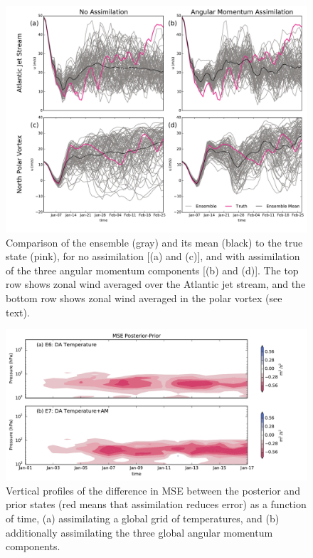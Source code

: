  \begin{figure}
	 \includegraphics[width=\textwidth]{Paper_figures/ERPDA_paper_point_checks.pdf}
	 \caption{Comparison of the ensemble (gray) and its mean (black) to the true state (pink), for no assimilation [(a) and (c)], and with assimilation of the three angular momentum components [(b) and (d)]. The top row shows zonal wind averaged over the Atlantic jet stream, and the bottom row shows zonal wind averaged in the polar vortex (see text).}
	 \label{fig:point_checks}
\end{figure}




 \begin{figure}
	 \includegraphics[width=\textwidth]{Paper_figures/ERPDA_paper_MSEincrement_comparison.pdf}
	 \caption{Vertical profiles of the difference in MSE between the posterior and prior states (red means that assimilation reduces error) as a function of time, (a) assimilating a global grid of temperatures, and (b) additionally assimilating the three global angular momentum components.}
	 \label{fig:added_value_MSEincrement}
\end{figure}



